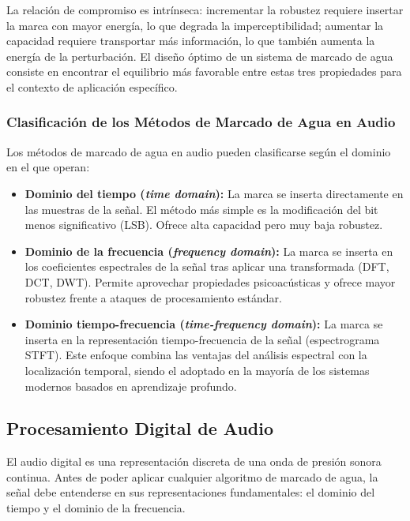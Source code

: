 La relación de compromiso es intrínseca: incrementar la robustez requiere insertar la marca con mayor energía, lo que degrada la imperceptibilidad; aumentar la capacidad requiere transportar más información, lo que también aumenta la energía de la perturbación. El diseño óptimo de un sistema de marcado de agua consiste en encontrar el equilibrio más favorable entre estas tres propiedades para el contexto de aplicación específico.

\subsubsection{Clasificación de los Métodos de Marcado de Agua en Audio}

Los métodos de marcado de agua en audio pueden clasificarse según el dominio en el que operan:

\begin{itemize}
    \item \textbf{Dominio del tiempo (\textit{time domain}):} La marca se inserta directamente en las muestras de la señal. El método más simple es la modificación del bit menos significativo (LSB). Ofrece alta capacidad pero muy baja robustez.

    \item \textbf{Dominio de la frecuencia (\textit{frequency domain}):} La marca se inserta en los coeficientes espectrales de la señal tras aplicar una transformada (DFT, DCT, DWT). Permite aprovechar propiedades psicoacústicas y ofrece mayor robustez frente a ataques de procesamiento estándar.

    \item \textbf{Dominio tiempo-frecuencia (\textit{time-frequency domain}):} La marca se inserta en la representación tiempo-frecuencia de la señal (espectrograma STFT). Este enfoque combina las ventajas del análisis espectral con la localización temporal, siendo el adoptado en la mayoría de los sistemas modernos basados en aprendizaje profundo.
\end{itemize}

\subsection{Procesamiento Digital de Audio}
\label{sec:procesamiento_audio}

El audio digital es una representación discreta de una onda de presión sonora continua. Antes de poder aplicar cualquier algoritmo de marcado de agua, la señal debe entenderse en sus representaciones fundamentales: el dominio del tiempo y el dominio de la frecuencia.

